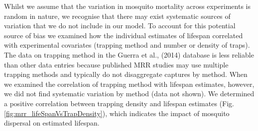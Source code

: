 \documentclass[12pt]{article}
\begin{document}
Whilst we assume that the variation in mosquito mortality across experiments is random in nature, we recognise that there may exist systematic sources of variation that we do not include in our model. To account for this potential source of bias we examined how the individual estimates of lifespan correlated with experimental covariates (trapping method and number or density of traps). The data on trapping method in the Guerra et al., (2014) database is less reliable than other data entries because published MRR studies may use multiple trapping methods and typically do not disaggregate captures by method. When we examined the correlation of trapping method with lifespan estimates, however, we did not find systematic variation by method (data not shown). We determined a positive correlation between trapping density and lifespan estimates (Fig. \ref{fig:mrr_lifeSpanVsTrapDensity}), which indicates the impact of mosquito dispersal on estimated lifespan.
\end{document}
